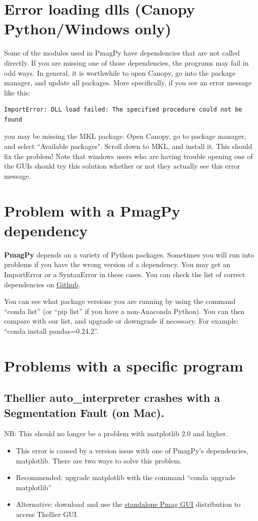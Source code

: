 \documentclass[11pt]{book}
\begin{document}
{{\section{Error loading dlls (Canopy Python/Windows only)}
Some of the modules used in PmagPy have dependencies that are not called directly.  If you are missing one of those dependencies, the programs may fail in odd ways.  In general, it is worthwhile to open Canopy, go into the package manager, and update all packages.  More specifically, if you see an error message like this: \begin{verbatim}ImportError: DLL load failed: The specified procedure could not be found  \end{verbatim} you may be missing the MKL package.  Open Canopy, go to package manager, and select ``Available packages".  Scroll down to MKL, and install it.  This should fix the problem!  Note that windows users who are having trouble opening one of the GUIs should try this solution whether or not they actually see this error message.

\section{Problem with a PmagPy dependency}

{\bf PmagPy} depends on a variety of Python packages.  Sometimes you will run into problems if you have the wrong version of a dependency.  You may get an ImportError or a SyntaxError in these cases.  You can check the list of correct dependencies on \href{https://github.com/PmagPy/PmagPy/blob/master/environment.yml}{Github}.

You can see what package versions you are running by using the command ``conda list'' (or ``pip list'' if you have a non-Anaconda Python).  You can then compare with our list, and upgrade or downgrade if necessary.  For example: ``conda install pandas=0.24.2''.

\section{Problems with a specific program}
\subsection{Thellier auto\_interpreter crashes with a Segmentation Fault (on Mac).}

NB: This should no longer be a problem with matplotlib 2.0 and higher.
  \begin{itemize}
  \item This error is caused by a version issue with one of PmagPy's dependencies, matplotlib.  There are two ways to solve this problem.
  \item Recommended: upgrade matplotlib with the command ``conda upgrade matplotlib''
  \item Alternative: download and use the \href{#standalone}{standalone Pmag GUI} distribution to access Thellier GUI.
  \end{itemize}


}}
\end{document}
